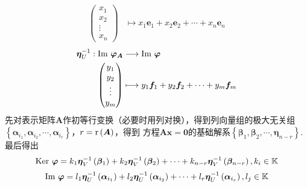 {\begin{align*}
        \begin{pmatrix}
            x_1 \\x_2\\\vdots\\x_n
        \end{pmatrix}                      & \longmapsto
        x_1\bm{e}_1+x_2\bm{e}_2+\cdots+x_n\bm{e}_n
    \end{align*}
    \begin{align*}
        \bm{\eta}_U^{-1}:\operatorname{Im\,}\bm{\varphi}_{\bm{A}} & \longrightarrow \operatorname{Im\,}\bm{\varphi} \\
        \begin{pmatrix}
            y_1 \\y_2\\\vdots\\y_m
        \end{pmatrix}                       & \longmapsto
        y_1\bm{f}_1+y_2\bm{f}_2+\cdots+y_m\bm{f}_m
    \end{align*}
}
先对表示矩阵$\bm{A}$作初等行变换（必要时用列对换），得到列向量组的极大无关组$\left\{
    \bm{\alpha}_{i_1},\bm{\alpha}_{i_2},\cdots,\bm{\alpha}_{i_r}
    \right\}$，$r=\mathrm{r} \left(\bm{A}\right)$，得到
方程$\bm{Ax}=\bm{0}$的基础解系$\left\{\bm{\beta}_1,\bm{\beta}_2,\cdots,\bm{\eta}_{n-r}\right\}$.最后得出
\[
    \operatorname{Ker\,} \bm{\varphi}=k_1\bm{\eta}_V^{-1}\left(\bm{\beta}_1\right)+
    k_2\bm{\eta}_V^{-1}\left(\bm{\beta}_2\right)+\cdots+
    k_{n-r}\bm{\eta}_V^{-1}\left(\bm{\beta}_{n-r}\right),k_i \in \mathbb{K}
\]
\[
    \operatorname{Im\,}\bm{\varphi}=l_1\bm{\eta}_U^{-1}\left(\bm{\alpha}_{i_1}\right)+
    l_2\bm{\eta}_U^{-1}\left(\bm{\alpha}_{i_2}\right)
    +\cdots+
    l_r\bm{\eta}_U^{-1}\left(\bm{\alpha}_{i_r}\right),l_j \in \mathbb{K}
\]
